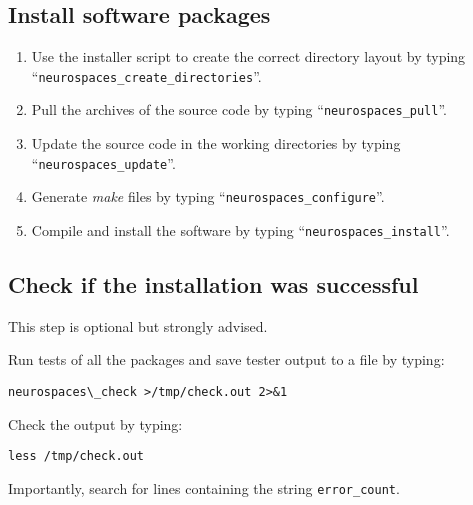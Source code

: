 \documentclass[12pt]{article}
\begin{document}
\subsection*{Install software packages}

\begin{enumerate}
   \item Use the installer script to create the correct directory layout by typing ``{\tt neurospaces\_create\_directories}''.
   \item Pull the archives of the source code by typing ``{\tt neurospaces\_pull}''.
   \item Update the source code in the working directories by typing ``{\tt neurospaces\_update}''.
   \item Generate {\it make} files by typing ``{\tt neurospaces\_configure}''.
   \item Compile and install the software by typing ``{\tt neurospaces\_install}''.
\end{enumerate}

\subsection*{Check if the installation was successful}

This step is optional but strongly advised.

\begin{description}
   \item Run tests of all the packages and save tester output to a file  by typing:
   \begin{verbatim}
neurospaces\_check >/tmp/check.out 2>&1
   \end{verbatim}
   \item Check the output by typing:
   \begin{verbatim}
less /tmp/check.out
   \end{verbatim}
   \item Importantly, search for lines containing the string {\tt error\_count}.
\end{description}
    


\end{document}
